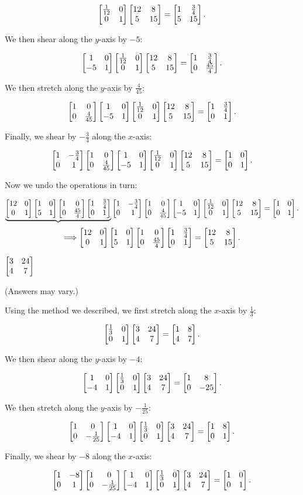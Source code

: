 \documentclass[../gatm_answers.tex]{subfiles}
\begin{document}
\begin{iinner_problem}
\begin{iinner_problem}
\begin{iinner_problem}
$$\twomat{\frac{1}{12}}{0}{0}{1}\twomat{12}{8}{5}{15} = \twomat{1}{\frac{3}{4}}{5}{15}.$$

We then shear along the $y$-axis by $-5$:

$$\twomat{1}{0}{-5}{1}\twomat{\frac{1}{12}}{0}{0}{1}\twomat{12}{8}{5}{15} = \twomat{1}{\frac{3}{4}}{0}{\frac{45}{4}}.$$

We then stretch along the $y$-axis by $\frac{4}{45}$:

$$\twomat{1}{0}{0}{\frac{4}{45}}\twomat{1}{0}{-5}{1}\twomat{\frac{1}{12}}{0}{0}{1}\twomat{12}{8}{5}{15} = \twomat{1}{\frac{3}{4}}{0}{1}.$$

Finally, we shear by $-\frac{3}{4}$ along the $x$-axis:

$$\twomat{1}{-\frac{3}{4}}{0}{1}\twomat{1}{0}{0}{\frac{4}{45}}\twomat{1}{0}{-5}{1}\twomat{\frac{1}{12}}{0}{0}{1}\twomat{12}{8}{5}{15} = \twomat{1}{0}{0}{1}.$$

Now we undo the operations in turn:

$$\underbrace{\twomat{12}{0}{0}{1}\twomat{1}{0}{5}{1}\twomat{1}{0}{0}{\frac{45}{4}}\twomat{1}{\frac{3}{4}}{0}{1}}\twomat{1}{-\frac{3}{4}}{0}{1}\twomat{1}{0}{0}{\frac{4}{45}}\twomat{1}{0}{-5}{1}\twomat{\frac{1}{12}}{0}{0}{1}\twomat{12}{8}{5}{15} = \twomat{1}{0}{0}{1}.$$
$$\Longrightarrow \twomat{12}{0}{0}{1}\twomat{1}{0}{5}{1}\twomat{1}{0}{0}{\frac{45}{4}}\twomat{1}{\frac{3}{4}}{0}{1} = \twomat{12}{8}{5}{15}.$$

\begin{inner_problem}
\item $\twomat{3}{24}{4}{7}$
\end{inner_problem}

(Answers may vary.)

Using the method we described, we first stretch along the $x$-axis by $\frac{1}{3}$:

$$\twomat{\frac{1}{3}}{0}{0}{1}\twomat{3}{24}{4}{7} = \twomat{1}{8}{4}{7}.$$

We then shear along the $y$-axis by $-4$:

$$\twomat{1}{0}{-4}{1}\twomat{\frac{1}{3}}{0}{0}{1}\twomat{3}{24}{4}{7} = \twomat{1}{8}{0}{-25}.$$

We then stretch along the $y$-axis by $-\frac{1}{25}$:

$$\twomat{1}{0}{0}{-\frac{1}{25}}\twomat{1}{0}{-4}{1}\twomat{\frac{1}{3}}{0}{0}{1}\twomat{3}{24}{4}{7} = \twomat{1}{8}{0}{1}.$$

Finally, we shear by $-8$ along the $x$-axis:

$$\twomat{1}{-8}{0}{1}\twomat{1}{0}{0}{-\frac{1}{25}}\twomat{1}{0}{-4}{1}\twomat{\frac{1}{3}}{0}{0}{1}\twomat{3}{24}{4}{7} = \twomat{1}{0}{0}{1}.$$


\end{iinner_problem}
\end{iinner_problem}
\end{iinner_problem}
\end{document}
